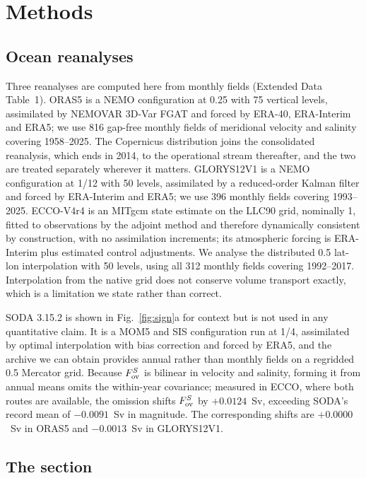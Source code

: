 \section*{Methods}

\subsection*{Ocean reanalyses}

Three reanalyses are computed here from monthly fields (Extended Data
Table~1). ORAS5\cite{Zuo2019} is a NEMO configuration at 0.25\degree{} with 75
vertical levels, assimilated by NEMOVAR 3D-Var FGAT and forced by ERA-40,
ERA-Interim and ERA5; we use 816 gap-free monthly fields of meridional velocity
and salinity covering 1958--2025. The Copernicus distribution joins the
consolidated reanalysis, which ends in 2014, to the operational stream
thereafter, and the two are treated separately wherever it matters.
GLORYS12V1\cite{JeanMichel2021} is a NEMO configuration at 1/12\degree{} with 50
levels, assimilated by a reduced-order Kalman filter and forced by ERA-Interim
and ERA5; we use 396 monthly fields covering 1993--2025. ECCO-V4r4\cite{Forget2015}
is an MITgcm state estimate on the LLC90 grid, nominally 1\degree{}, fitted to
observations by the adjoint method and therefore dynamically consistent by
construction, with no assimilation increments; its atmospheric forcing is
ERA-Interim plus estimated control adjustments. We analyse the distributed
0.5\degree{} lat-lon interpolation with 50 levels, using all 312 monthly fields
covering 1992--2017. Interpolation from the native grid does not conserve volume
transport exactly, which is a limitation we state rather than correct.

SODA 3.15.2\cite{Carton2018} is shown in Fig.~\ref{fig:sign}a for context but is
not used in any quantitative claim. It is a MOM5 and SIS configuration run at
1/4\degree{}, assimilated by optimal interpolation with bias correction and
forced by ERA5, and the archive we can obtain provides annual rather than
monthly fields on a regridded 0.5\degree{} Mercator grid. Because $F_{\mathrm{ov}}^{S}$ is
bilinear in velocity and salinity, forming it from annual means omits the
within-year covariance; measured in ECCO, where both routes are available, the
omission shifts $F_{\mathrm{ov}}^{S}$ by $+0.0124$~Sv, exceeding SODA's record mean of
$-0.0091$~Sv in magnitude. The corresponding shifts are $+0.0000$~Sv in ORAS5
and $-0.0013$~Sv in GLORYS12V1.

\subsection*{The section}


